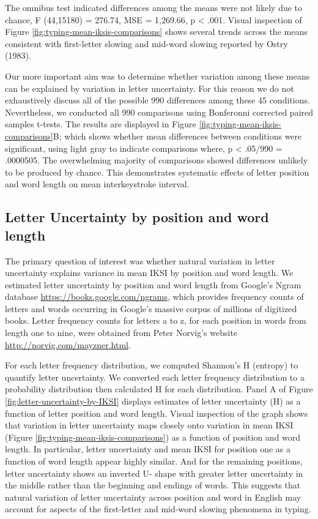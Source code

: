 \documentclass[,man,donotrepeattitle,floatsintext]{apa6}
\begin{document}
The omnibus test indicated differences among the means were not likely due to chance, F (44,15180) = 276.74, MSE = 1,269.66, p \textless{} .001. Visual inspection of Figure \ref{fig:typing-mean-iksis-comparisons} shows several trends across the means consistent with first-letter slowing and mid-word slowing reported by Ostry (1983).

Our more important aim was to determine whether variation among these means can be explained by variation in letter uncertainty. For this reason we do not exhaustively discuss all of the possible 990 differences among these 45 conditions. Nevertheless, we conducted all 990 comparisons using Bonferonni corrected paired samples t-tests. The results are displayed in Figure \ref{fig:typing-mean-iksis-comparisons}B; which shows whether mean differences between conditions were significant, using light gray to indicate comparisons where, p \textless{} .05/990 = .0000505. The overwhelming majority of comparisons showed differences unlikely to be produced by chance. This demonstrates systematic effects of letter position and word length on mean interkeystroke interval.

\hypertarget{letter-uncertainty-by-position-and-word-length}{%
\subsection{Letter Uncertainty by position and word length}\label{letter-uncertainty-by-position-and-word-length}}

The primary question of interest was whether natural variation in letter uncertainty explains variance in mean IKSI by position and word length. We estimated letter uncertainty by position and word length from Google's Ngram database \url{https://books.google.com/ngrams}, which provides frequency counts of letters and words occurring in Google's massive corpus of millions of digitized books. Letter frequency counts for letters a to z, for each position in words from length one to nine, were obtained from Peter Norvig's website \url{http://norvig.com/mayzner.html}.

For each letter frequency distribution, we computed Shannon's H (entropy) to quantify letter uncertainty. We converted each letter frequency distribution to a probability distribution then calculated H for each distribution. Panel A of Figure \ref{fig:letter-uncertainty-by-IKSI} displays estimates of letter uncertainty (H) as a function of letter position and word length. Visual inspection of the graph shows that variation in letter uncertainty maps closely onto variation in mean IKSI (Figure \ref{fig:typing-mean-iksis-comparisons}) as a function of position and word length. In particular, letter uncertainty and mean IKSI for position one as a function of word length appear highly similar. And for the remaining positions, letter uncertainty shows an inverted U- shape with greater letter uncertainty in the middle rather than the beginning and endings of words. This suggests that natural variation of letter uncertainty across position and word in English may account for aspects of the first-letter and mid-word slowing phenomena in typing.
\end{document}
